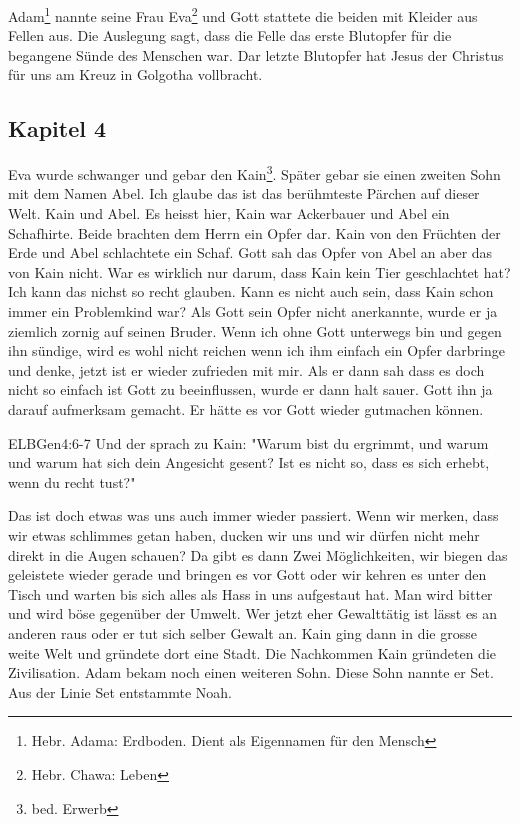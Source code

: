 Adam\footnote{Hebr. Adama: Erdboden. Dient als Eigennamen für den Mensch} nannte seine Frau Eva\footnote{Hebr. Chawa: Leben} und Gott stattete die beiden mit Kleider aus Fellen aus. Die Auslegung sagt, dass die Felle das erste Blutopfer für die begangene Sünde des Menschen war. Dar letzte Blutopfer hat Jesus der Christus für uns am Kreuz in Golgotha vollbracht.

\subsection{Kapitel 4}
Eva wurde schwanger und gebar den Kain\footnote{bed. Erwerb}. Später gebar sie einen zweiten Sohn mit dem Namen Abel. Ich glaube das ist das berühmteste Pärchen auf dieser Welt. Kain und Abel. Es heisst hier, Kain war Ackerbauer und Abel ein Schafhirte. Beide brachten dem Herrn ein Opfer dar. Kain von den Früchten der Erde und Abel schlachtete ein Schaf. Gott sah das Opfer von Abel an aber das von Kain nicht. War es wirklich nur darum, dass Kain kein Tier geschlachtet hat? Ich kann das nichst so recht glauben. Kann es nicht auch sein, dass Kain schon immer ein Problemkind war? Als Gott sein Opfer nicht anerkannte, wurde er ja ziemlich zornig auf seinen Bruder. Wenn ich ohne Gott unterwegs bin und gegen ihn sündige, wird es wohl nicht reichen wenn ich ihm einfach ein Opfer darbringe und denke, jetzt ist er wieder zufrieden mit mir. Als er dann sah dass es doch nicht so einfach ist Gott zu beeinflussen, wurde er dann halt sauer. Gott ihn ja darauf aufmerksam gemacht. Er hätte es vor Gott wieder gutmachen können.
\begin{bibeltext}{ELB}{Gen}{4:6-7}
	Und der \herr{} sprach zu Kain: "Warum bist du ergrimmt, und warum und warum hat sich dein Angesicht gesent? Ist es nicht so, dass es sich erhebt, wenn du recht tust?"
\end{bibeltext}
Das ist doch etwas was uns auch immer wieder passiert. Wenn wir merken, dass wir etwas schlimmes getan haben, ducken wir uns und wir dürfen nicht mehr direkt in die Augen schauen? Da gibt es dann Zwei Möglichkeiten, wir biegen das geleistete wieder gerade und bringen es vor Gott oder wir kehren es unter den Tisch und warten bis sich alles als Hass in uns aufgestaut hat. Man wird bitter und wird böse gegenüber der Umwelt. Wer jetzt eher Gewalttätig ist lässt es an anderen raus oder er tut sich selber Gewalt an. Kain ging dann in die grosse weite Welt und gründete dort eine Stadt. Die Nachkommen Kain gründeten die Zivilisation. Adam bekam noch einen weiteren Sohn. Diese Sohn nannte er Set. Aus der Linie Set entstammte Noah.
